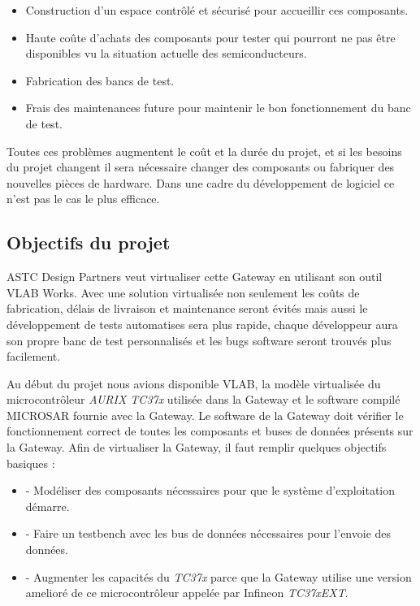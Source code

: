 \begin{itemize} 

    \item Construction d'un espace contrôlé et sécurisé pour accueillir ces composants. 

    \item Haute coûte d'achats des composants pour tester qui pourront ne pas être disponibles vu la situation actuelle des semiconducteurs. 

    \item Fabrication des bancs de test. 

    \item Frais des maintenances future pour maintenir le bon fonctionnement du banc de test.   

\end{itemize} 

Toutes ces problèmes augmentent le co\^ut et la durée du projet, et si les besoins du projet changent il sera nécessaire changer des composants ou fabriquer des nouvelles pièces de hardware. Dans une cadre du développement de logiciel ce n'est pas le cas le plus efficace. 

\subsection{Objectifs du projet} 

  

ASTC Design Partners veut virtualiser cette Gateway en utilisant son outil VLAB Works. Avec une solution virtualis\'ee non seulement les coûts de fabrication, délais de livraison et maintenance seront évités mais aussi le développement de tests automatises sera plus rapide, chaque développeur aura son propre banc de test personnalisés et les bugs software seront trouvés plus facilement.  

Au début du projet nous avions disponible VLAB, la modèle virtualis\'ee du microcontrôleur \textit{AURIX TC37x} utilisée dans la Gateway et le software compil\'e MICROSAR fournie avec la Gateway. Le software de la Gateway doit vérifier le fonctionnement correct de toutes les composants et buses de données présents sur la Gateway. Afin de virtualiser la Gateway, il faut remplir quelques objectifs basiques :  

\begin{itemize} 

    \item - Modéliser des composants nécessaires pour que le système d'exploitation démarre. 

    \item - Faire un testbench avec les bus de donn\'ees nécessaires pour l'envoie des donn\'ees. 

    \item - Augmenter les capacit\'es du \textit{TC37x} parce que la Gateway utilise une version amelior\'e de ce microcontr\^oleur appelée par Infineon \textit{TC37xEXT}\cite{aurix.tc37e}. 

\end{itemize} 
